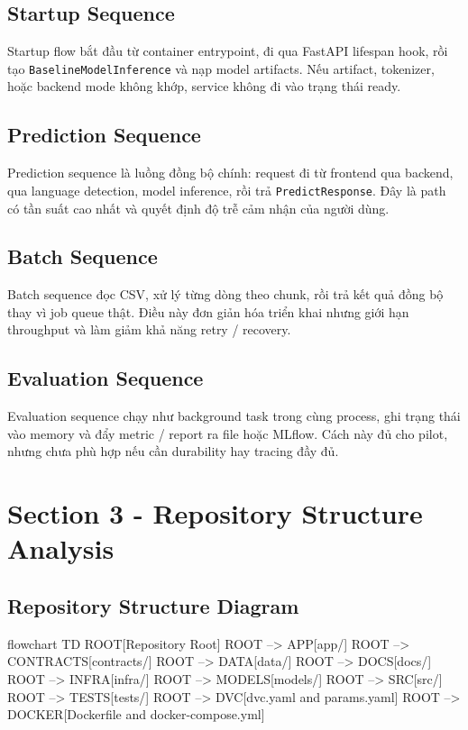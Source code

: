 \subsection{Startup Sequence}
Startup flow bắt đầu từ container entrypoint, đi qua FastAPI lifespan hook, rồi tạo \texttt{BaselineModelInference} và nạp model artifacts. Nếu artifact, tokenizer, hoặc backend mode không khớp, service không đi vào trạng thái ready.

\subsection{Prediction Sequence}
Prediction sequence là luồng đồng bộ chính: request đi từ frontend qua backend, qua language detection, model inference, rồi trả \texttt{PredictResponse}. Đây là path có tần suất cao nhất và quyết định độ trễ cảm nhận của người dùng.

\subsection{Batch Sequence}
Batch sequence đọc CSV, xử lý từng dòng theo chunk, rồi trả kết quả đồng bộ thay vì job queue thật. Điều này đơn giản hóa triển khai nhưng giới hạn throughput và làm giảm khả năng retry / recovery.

\subsection{Evaluation Sequence}
Evaluation sequence chạy như background task trong cùng process, ghi trạng thái vào memory và đẩy metric / report ra file hoặc MLflow. Cách này đủ cho pilot, nhưng chưa phù hợp nếu cần durability hay tracing đầy đủ.

\section{Section 3 - Repository Structure Analysis}
\subsection{Repository Structure Diagram}
\begin{mermaidblock}
flowchart TD
  ROOT[Repository Root]
  ROOT --> APP[app/]
  ROOT --> CONTRACTS[contracts/]
  ROOT --> DATA[data/]
  ROOT --> DOCS[docs/]
  ROOT --> INFRA[infra/]
  ROOT --> MODELS[models/]
  ROOT --> SRC[src/]
  ROOT --> TESTS[tests/]
  ROOT --> DVC[dvc.yaml and params.yaml]
  ROOT --> DOCKER[Dockerfile and docker-compose.yml]
\end{mermaidblock}

